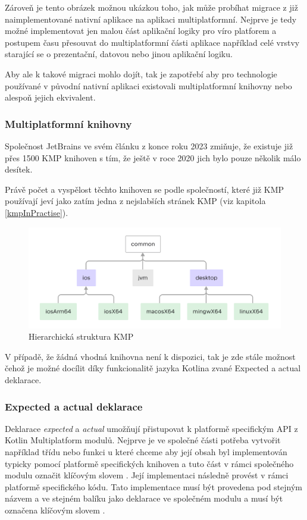 Zároveň je tento obrázek možnou ukázkou toho, jak může probíhat migrace z již naimplementované nativní aplikace na aplikaci
multiplatformní. Nejprve je tedy možné implementovat jen malou část aplikační logiky pro víro platforem a postupem času přesouvat
do multiplatformní části aplikace například celé vrstvy starající se o prezentační, datovou nebo jinou aplikační logiku. \cite{KMPUseCases}

Aby ale k takové migraci mohlo dojít, tak je zapotřebí aby pro technologie používané v původní nativní aplikaci existovali multiplatformní
knihovny nebo alespoň jejich ekvivalent.

\subsubsection*{Multiplatformní knihovny}
Společnost JetBrains ve svém článku z konce roku 2023 zmiňuje, že existuje již přes 1500 KMP knihoven s tím, že ještě v roce 2020
jich bylo pouze několik málo desítek. \cite{KMPstable}

Právě počet a vyspělost těchto knihoven se podle společností, které již KMP používají jeví jako zatím jedna z nejslabších stránek KMP (viz kapitola \ref{kmpInPractise}).


\begin{figure}[H]
  \centering
  \includegraphics[width=1\textwidth]{kotlin-multiplatform-hierarchical-structure.png}
  \caption{Hierarchická struktura KMP}
  \label{fig:KMP_struktura}
\end{figure}

V případě, že žádná vhodná knihovna není k dispozici, tak je zde stále možnost čehož je možné docílit díky funkcionalitě jazyka Kotlina
zvané Expected a actual deklarace.

\subsubsection*{Expected a actual deklarace}\label{expectActual}
Deklarace \textit{expected} a \textit{actual} umožňují přistupovat k platformě specifickým API z Kotlin Multiplatform modulů. \cite{KMPExpectActual}
Nejprve je ve společné části potřeba vytvořit například třídu nebo funkci u které chceme aby její obsah byl implementován typicky pomocí
platformě specifických knihoven a tuto část v rámci společného modulu označit klíčovým slovem . \cite{KMPExpectActual} Její implementaci následně provést v rámci
platformě specifického kódu. Tato implementace musí být provedena pod stejným názvem a ve stejném balíku jako deklarace ve společném modulu
a musí být označena klíčovým slovem . \cite{KMPExpectActual}

